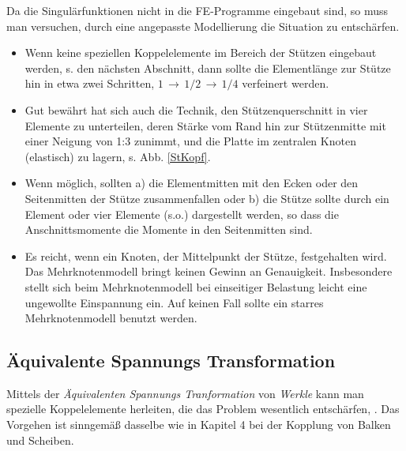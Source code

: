 Da die Singul\"{a}rfunktionen nicht in die FE-Programme eingebaut sind, so muss man versuchen, durch
eine angepasste Modellierung die Situation zu entsch\"{a}rfen.
\begin{itemize}
\item Wenn keine speziellen Koppelelemente im Bereich der St\"{u}tzen eingebaut werden, s. den n\"{a}chsten Abschnitt, dann sollte die Elementl\"{a}nge zur St\"{u}tze hin in etwa zwei
Schritten, $1\, \rightarrow \,1/2 \,\rightarrow \, 1/4$ verfeinert werden.
\item Gut bew\"{a}hrt hat sich auch die Technik, den St\"{u}tzenquerschnitt in vier Elemente zu unterteilen,
deren St\"{a}rke vom Rand hin zur St\"{u}tzenmitte mit einer Neigung von 1:3 zunimmt, und die
Platte im zentralen Knoten (elastisch) zu lagern, s. Abb. \ref{StKopf}.
\item Wenn m\"{o}glich, sollten a) die Elementmitten mit den Ecken oder den Seitenmitten der St\"{u}tze zusammenfallen
oder b) die St\"{u}tze sollte durch ein Element oder vier Elemente (s.o.) dargestellt
werden, so dass die Anschnittsmomente die Momente in den Seitenmitten sind.
\item Es reicht, wenn ein Knoten, der Mittelpunkt der St\"{u}tze, festgehalten wird. Das Mehrknotenmodell
bringt keinen Gewinn an Genauigkeit. Insbesondere stellt sich beim Mehrknotenmodell bei
einseitiger Belastung leicht eine ungewollte Einspannung ein. Auf keinen Fall sollte ein starres Mehrknotenmodell benutzt werden.
\end{itemize}

\vspace{-0.7cm}
\textcolor{sectionTitleBlue}{\section{\"{A}quivalente Spannungs Transformation}}
Mittels der {\em \"{A}quivalenten Spannungs Tranformation\/} von {\em Werkle\/} kann man spezielle Koppelelemente herleiten, die das Problem wesentlich entsch\"{a}rfen, \cite{Werkle}.  Das Vorgehen ist sinngem\"{a}{\ss} dasselbe wie in Kapitel 4 bei der Kopplung von Balken und Scheiben.

